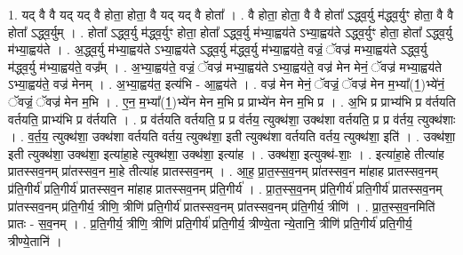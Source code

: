 \documentclass[17pt]{extarticle}
\begin{document}
1. यद् वै वै यद् यद् वै होता॒ होता॒ वै यद् यद् वै होता᳚ । . वै होता॒ होता॒ वै वै होता᳚ ऽद्ध्व॒र्यु म॑द्ध्व॒र्युꣳ होता॒ वै वै होता᳚ ऽद्ध्व॒र्युम् । . होता᳚ ऽद्ध्व॒र्यु म॑द्ध्व॒र्युꣳ होता॒ होता᳚ ऽद्ध्व॒र्यु म॑भ्या॒ह्वय॑ते ऽभ्या॒ह्वय॑ते ऽद्ध्व॒र्युꣳ होता॒ होता᳚ ऽद्ध्व॒र्यु म॑भ्या॒ह्वय॑ते । . अ॒द्ध्व॒र्यु म॑भ्या॒ह्वय॑ते ऽभ्या॒ह्वय॑ते ऽद्ध्व॒र्यु म॑द्ध्व॒र्यु म॑भ्या॒ह्वय॑ते॒ वज्रं॒ ॅवज्र॑ मभ्या॒ह्वय॑ते ऽद्ध्व॒र्यु म॑द्ध्व॒र्यु म॑भ्या॒ह्वय॑ते॒ वज्र᳚म् । . अ॒भ्या॒ह्वय॑ते॒ वज्रं॒ ॅवज्र॑ मभ्या॒ह्वय॑ते ऽभ्या॒ह्वय॑ते॒ वज्र॑ मेन मेनं॒ ॅवज्र॑ मभ्या॒ह्वय॑ते ऽभ्या॒ह्वय॑ते॒ वज्र॑ मेनम् । . अ॒भ्या॒ह्वय॑त॒ इत्य॑भि - आ॒ह्वय॑ते । . वज्र॑ मेन मेनं॒ ॅवज्रं॒ ॅवज्र॑ मेन म॒भ्या᳚(1॒)भ्ये॑नं॒ ॅवज्रं॒ ॅवज्र॑ मेन म॒भि । . ए॒न॒ म॒भ्या᳚(1॒)भ्ये॑न मेन म॒भि प्र प्राभ्ये॑न मेन म॒भि प्र । . अ॒भि प्र प्राभ्य॑भि प्र व॑र्तयति वर्तयति॒ प्राभ्य॑भि प्र व॑र्तयति । . प्र व॑र्तयति वर्तयति॒ प्र प्र व॑र्तय॒ त्युक्थ॑शा॒ उक्थ॑शा वर्तयति॒ प्र प्र व॑र्तय॒ त्युक्थ॑शाः । . व॒र्त॒य॒ त्युक्थ॑शा॒ उक्थ॑शा वर्तयति वर्तय॒ त्युक्थ॑शा॒ इती त्युक्थ॑शा वर्तयति वर्तय॒ त्युक्थ॑शा॒ इति॑ । . उक्थ॑शा॒ इती त्युक्थ॑शा॒ उक्थ॑शा॒ इत्या॑हा॒हे त्युक्थ॑शा॒ उक्थ॑शा॒ इत्या॑ह । . उक्थ॑शा॒ इत्युक्थ॑-शाः॒ । . इत्या॑हा॒हे तीत्या॑ह प्रातस्सव॒नम् प्रा॑तस्सव॒न मा॒हे तीत्या॑ह प्रातस्सव॒नम् । . आ॒ह॒ प्रा॒त॒स्स॒व॒नम् प्रा॑तस्सव॒न मा॑हाह प्रातस्सव॒नम् प्र॑ति॒गीर्य॑ प्रति॒गीर्य॑ प्रातस्सव॒न मा॑हाह प्रातस्सव॒नम् प्र॑ति॒गीर्य॑ । . प्रा॒त॒स्स॒व॒नम् प्र॑ति॒गीर्य॑ प्रति॒गीर्य॑ प्रातस्सव॒नम् प्रा॑तस्सव॒नम् प्र॑ति॒गीर्य॒ त्रीणि॒ त्रीणि॑ प्रति॒गीर्य॑ प्रातस्सव॒नम् प्रा॑तस्सव॒नम् प्र॑ति॒गीर्य॒ त्रीणि॑ । . प्रा॒त॒स्स॒व॒नमिति॑ प्रातः - स॒व॒नम् । . प्र॒ति॒गीर्य॒ त्रीणि॒ त्रीणि॑ प्रति॒गीर्य॑ प्रति॒गीर्य॒ त्रीण्ये॒ता न्ये॒तानि॒ त्रीणि॑ प्रति॒गीर्य॑ प्रति॒गीर्य॒ त्रीण्ये॒तानि॑ । \newline
\end{document}

